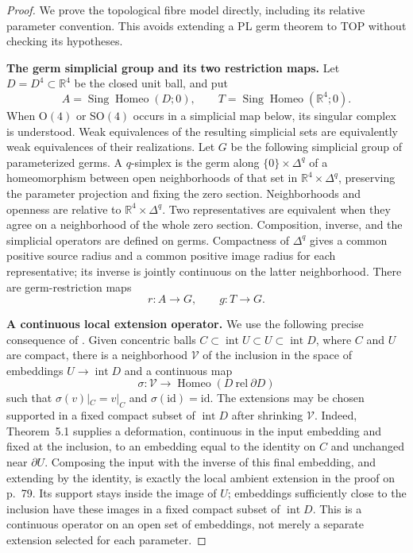 \begin{proof}
We prove the topological fibre model directly, including its relative
parameter convention. This avoids extending a PL germ theorem to TOP
without checking its hypotheses.

\smallskip\noindent
\textbf{The germ simplicial group and its two restriction maps.}
Let $D=D^4\subset\mathbb R^4$ be the closed unit ball, and put
\[
 A=\operatorname{Sing}\operatorname{Homeo}(D;0),\qquad
 T=\operatorname{Sing}\operatorname{Homeo}(\mathbb R^4;0).
\]
When $\mathrm O(4)$ or $\mathrm{SO}(4)$ occurs in a simplicial map
below, its singular complex is understood. Weak equivalences of
the resulting simplicial sets are equivalently weak equivalences
of their realizations.
Let $G$ be the following simplicial group of parameterized germs.
A $q$-simplex is the germ along $\{0\}\times\Delta^q$ of a
homeomorphism between open neighborhoods of that set in
$\mathbb R^4\times\Delta^q$, preserving the parameter projection
and fixing the zero section. Neighborhoods and openness are relative
to $\mathbb R^4\times\Delta^q$. Two representatives are equivalent
when they agree on a neighborhood of the whole zero section.
Composition, inverse, and the simplicial operators are defined on
germs. Compactness of $\Delta^q$ gives a common positive source
radius and a common positive image radius for each representative;
its inverse is jointly continuous on the latter neighborhood.
There are germ-restriction maps
\[
 r:A\longrightarrow G,\qquad g:T\longrightarrow G.
                                                        \tag{A.132.3}
\]

\smallskip\noindent
\textbf{A continuous local extension operator.}
We use the following precise consequence of
\cite[Theorem~5.1, p.~70; proof of Corollary~1.2, p.~79]
{EdwardsKirby1971}. Given concentric balls
$C\subset\operatorname{int}U\subset U\subset\operatorname{int}D$,
where $C$ and $U$ are compact, there is a neighborhood $\mathcal V$
of the inclusion in the space of embeddings $U\to\operatorname{int}D$
and a continuous map
\[
 \sigma:\mathcal V\longrightarrow
 \operatorname{Homeo}(D\ \mathrm{rel}\ \partial D)
\]
such that $\sigma(v)|_C=v|_C$ and $\sigma(\mathrm{id})=\mathrm{id}$.
The extensions may be chosen supported in a fixed compact subset of
$\operatorname{int}D$ after shrinking $\mathcal V$.
Indeed, Theorem~5.1 supplies a deformation, continuous in the input
embedding and fixed at the inclusion, to an embedding equal to the
identity on $C$ and unchanged near $\partial U$. Composing the input
with the inverse of this final embedding, and extending by the
identity, is exactly the local ambient extension in the proof on
p.~79. Its support stays inside the image of $U$; embeddings
sufficiently close to the inclusion have these images in a fixed
compact subset of $\operatorname{int}D$.
This is a continuous operator on an open set of embeddings, not
merely a separate extension selected for each parameter.


\end{proof}
